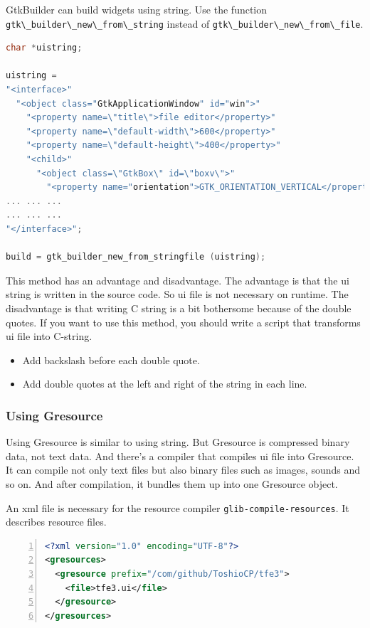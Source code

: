 GtkBuilder can build widgets using string. Use the function
\passthrough{\lstinline!gtk\_builder\_new\_from\_string!} instead of
\passthrough{\lstinline!gtk\_builder\_new\_from\_file!}.

\begin{lstlisting}[language=C]
char *uistring;

uistring =
"<interface>"
  "<object class="GtkApplicationWindow" id="win">"
    "<property name=\"title\">file editor</property>"
    "<property name=\"default-width\">600</property>"
    "<property name=\"default-height\">400</property>"
    "<child>"
      "<object class=\"GtkBox\" id=\"boxv\">"
        "<property name="orientation">GTK_ORIENTATION_VERTICAL</property>"
... ... ...
... ... ...
"</interface>";

build = gtk_builder_new_from_stringfile (uistring);
\end{lstlisting}

This method has an advantage and disadvantage. The advantage is that the
ui string is written in the source code. So ui file is not necessary on
runtime. The disadvantage is that writing C string is a bit bothersome
because of the double quotes. If you want to use this method, you should
write a script that transforms ui file into C-string.

\begin{itemize}
\tightlist
\item
  Add backslash before each double quote.
\item
  Add double quotes at the left and right of the string in each line.
\end{itemize}

\hypertarget{using-gresource}{%
\subsubsection{Using Gresource}\label{using-gresource}}

Using Gresource is similar to using string. But Gresource is compressed
binary data, not text data. And there's a compiler that compiles ui file
into Gresource. It can compile not only text files but also binary files
such as images, sounds and so on. And after compilation, it bundles them
up into one Gresource object.

An xml file is necessary for the resource compiler
\passthrough{\lstinline!glib-compile-resources!}. It describes resource
files.

\begin{lstlisting}[language=XML, numbers=left]
<?xml version="1.0" encoding="UTF-8"?>
<gresources>
  <gresource prefix="/com/github/ToshioCP/tfe3">
    <file>tfe3.ui</file>
  </gresource>
</gresources>
\end{lstlisting}

